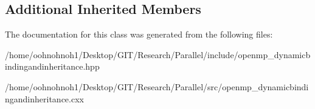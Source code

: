 \subsection*{Additional Inherited Members}


The documentation for this class was generated from the following files\+:\begin{DoxyCompactItemize}
\item 
/home/oohnohnoh1/\+Desktop/\+G\+I\+T/\+Research/\+Parallel/include/openmp\+\_\+dynamicbindingandinheritance.\+hpp\item 
/home/oohnohnoh1/\+Desktop/\+G\+I\+T/\+Research/\+Parallel/src/openmp\+\_\+dynamicbindingandinheritance.\+cxx\end{DoxyCompactItemize}
